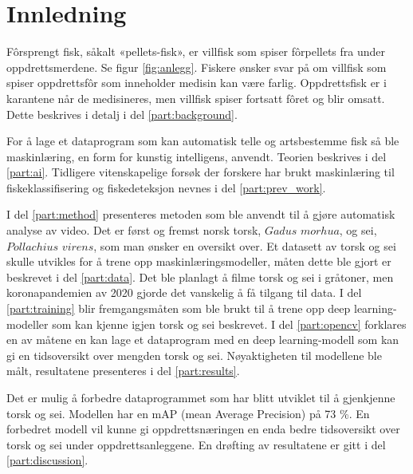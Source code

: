 \section{Innledning}




Fôrsprengt fisk, såkalt «pellets-fisk», er villfisk som spiser fôrpellets fra under oppdrettsmerdene. Se figur \ref{fig:anlegg}. Fiskere ønsker svar på om villfisk som spiser oppdrettsfôr som inneholder medisin kan være farlig. Oppdrettsfisk er i karantene når de medisineres, men villfisk spiser fortsatt fôret og blir omsatt. Dette beskrives i detalj i del \ref{part:background}.

For å lage et dataprogram som kan automatisk telle og artsbestemme fisk så ble maskinlæring, en form for kunstig intelligens, anvendt. Teorien beskrives i del \ref{part:ai}. Tidligere vitenskapelige forsøk der forskere har brukt maskinlæring til fiskeklassifisering og fiskedeteksjon nevnes i del \ref{part:prev_work}. 

I del \ref{part:method} presenteres metoden som ble anvendt til å gjøre automatisk analyse av video. Det er først og fremst norsk torsk, $Gadus$ $morhua$, og sei, $Pollachius$ $virens$, som man ønsker en oversikt over. Et datasett av torsk og sei skulle utvikles for å trene opp maskinlæringsmodeller, måten dette ble gjort er beskrevet i del \ref{part:data}. Det ble planlagt å filme torsk og sei i gråtoner, men koronapandemien av 2020 gjorde det vanskelig å få tilgang til data. I del \ref{part:training} blir fremgangsmåten som ble brukt til å trene opp deep learning-modeller som kan kjenne igjen torsk og sei beskrevet. I del \ref{part:opencv} forklares en av måtene en kan lage et dataprogram med en deep learning-modell som kan gi en tidsoversikt over mengden torsk og sei. Nøyaktigheten til modellene ble målt, resultatene presenteres i del \ref{part:results}.

Det er mulig å forbedre dataprogrammet som har blitt utviklet til å gjenkjenne torsk og sei. Modellen har en mAP (mean Average Precision) på 73 \%. En forbedret modell vil kunne gi oppdrettsnæringen en enda bedre tidsoversikt over torsk og sei under oppdrettsanleggene. En drøfting av resultatene er gitt i del \ref{part:discussion}.

